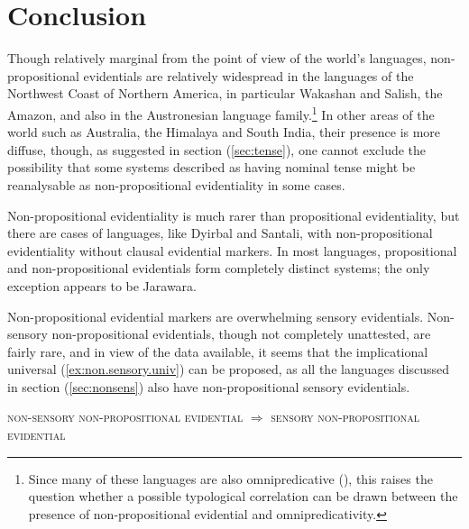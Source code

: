 \documentclass[oneside,a4paper,11pt]{article}
\begin{document}
\section{Conclusion}
Though relatively marginal from the point of view of the world's languages, non-propositional evidentials are relatively widespread in the languages of the Northwest Coast of Northern America, in particular Wakashan and Salish, the Amazon, and also in the  Austronesian language family.\footnote{Since many of these languages are also omnipredicative (\citealt{launey94, francois03predicat}), this raises the question whether a possible typological correlation can be drawn between the presence of non-propositional evidential and omnipredicativity. } In other areas of the world such as Australia, the Himalaya and South India, their presence is more diffuse, though, as suggested in section (\ref{sec:tense}), one cannot exclude the possibility that some systems described as having nominal tense might be reanalysable  as non-propositional evidentiality in some cases.

Non-propositional evidentiality is much rarer than propositional evidentiality, but there are cases of languages, like Dyirbal and Santali, with non-propositional evidentiality without clausal evidential markers. In most languages, propositional and non-propositional evidentials form completely distinct systems; the only exception appears to be Jarawara. 



Non-propositional evidential markers are overwhelming sensory evidentials.  Non-sensory non-propositional evidentials, though not completely unattested, are fairly rare, and  in view of the data available, it seems that the implicational universal (\ref{ex:non.sensory.univ}) can be proposed, as all the languages discussed in section (\ref{sec:nonsens}) also have non-propositional sensory evidentials.

\begin{exe}
\ex \label{ex:non.sensory.univ}
\glt \textsc{non-sensory non-propositional evidential} $\Rightarrow$ \textsc{sensory non-propositional evidential}
\end{exe}



\end{document}
